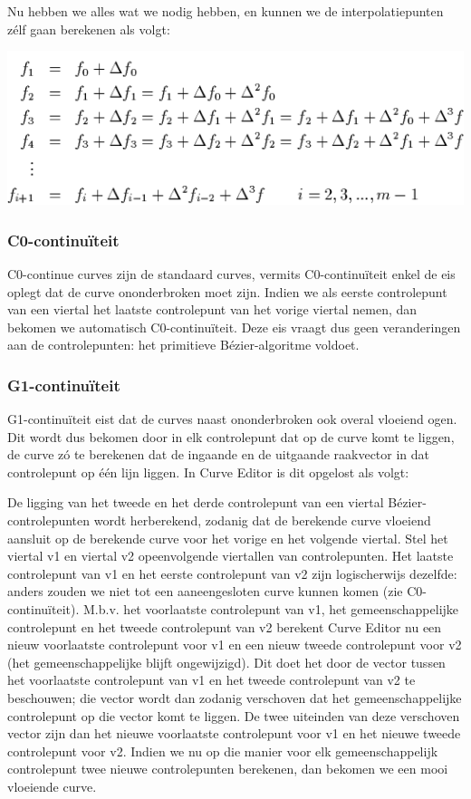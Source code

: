 \documentclass[a4paper,11pt,oneside, titlepage]{article}
\begin{document}
Nu hebben we alles wat we nodig hebben, en kunnen we de interpolatiepunten z\'elf gaan berekenen als volgt:
\begin{center}
\includegraphics[scale=0.6]{diff6.png}
\end{center}
\subsubsection{C0-continu\"iteit}
C0-continue curves zijn de standaard curves, vermits C0-continu\"iteit enkel de eis oplegt dat de curve ononderbroken moet zijn.
Indien we als eerste controlepunt van een viertal het laatste controlepunt van het vorige viertal nemen, dan bekomen we automatisch C0-continu\"iteit. Deze eis vraagt dus geen veranderingen aan de controlepunten: het primitieve
B\'ezier-algoritme voldoet.
\subsubsection{G1-continu\"iteit}
G1-continu\"iteit eist dat de curves naast ononderbroken ook overal vloeiend ogen. Dit wordt dus bekomen door in elk controlepunt dat op de curve komt te liggen, de curve z\'o te berekenen dat de ingaande en de uitgaande raakvector
in dat controlepunt op \'e\'en lijn liggen. In Curve Editor is dit opgelost als volgt:

De ligging van het tweede en het derde controlepunt van een viertal B\'ezier-controlepunten wordt herberekend, zodanig dat de berekende curve vloeiend aansluit op de berekende curve voor het vorige en het volgende viertal. Stel het viertal v1 en viertal v2 opeenvolgende viertallen van controlepunten. Het laatste controlepunt van v1 en het eerste controlepunt van v2 zijn logischerwijs dezelfde: anders zouden we niet tot een aaneengesloten curve kunnen komen (zie C0-continu\"iteit). M.b.v. het voorlaatste controlepunt van v1, het gemeenschappelijke controlepunt en het tweede controlepunt van v2 berekent Curve Editor nu een nieuw voorlaatste controlepunt voor v1 en een nieuw tweede controlepunt voor v2 (het gemeenschappelijke blijft ongewijzigd). Dit doet het door de vector tussen het voorlaatste controlepunt van v1 en het tweede controlepunt van v2 te beschouwen; die vector wordt dan zodanig verschoven dat het gemeenschappelijke controlepunt op die vector komt te liggen. De twee uiteinden van deze verschoven vector zijn dan het nieuwe voorlaatste controlepunt voor v1 en het nieuwe tweede controlepunt voor v2. Indien we nu op die manier voor elk gemeenschappelijk controlepunt twee nieuwe controlepunten berekenen, dan bekomen we een mooi vloeiende curve.
\end{document}
